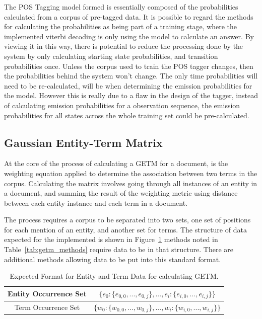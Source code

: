 \documentclass[10pt]{report}
\begin{document}
The POS Tagging model formed is essentially composed of the probabilities calculated from a corpus of pre-tagged data. It is possible to regard the methods for calculating the probabilities as being part of a training stage, where the implemented viterbi decoding is only using the model to calculate an answer. By viewing it in this way, there is potential to reduce the processing done by the system by only calculating starting state probabilities, and transition probabilities once. Unless the corpus used to train the POS tagger changes, then the probabilities behind the system won't change. The only time probabilities will need to be re-calculated, will be when determining the emission probabilities for the model. However this is really due to a flaw in the design of the tagger, instead of calculating emission probabilities for a observation sequence, the emission probabilities for all states across the whole training set could be pre-calculated.

\subsection{Gaussian Entity-Term Matrix}
At the core of the process of calculating a GETM for a document, is the weighting equation applied to determine the association between two terms in the corpus. Calculating the matrix involves going through all instances of an entity in a document, and summing the result of the weighting metric using distance between each entity instance and each term in a document.

The process requires a corpus to be separated into two sets, one set of positions for each mention of an entity, and another set for terms. The structure of data expected for the implemented is shown in Figure~\ref{fig:getm_data} methods noted in Table~\ref{tab:getm_methods} require data to be in that structure. There are additional methods allowing data to be put into this standard format.

\renewcommand{\baselinestretch}{2.0}\normalsize

\begin{table}[h!]
\centering
  \begin{tabular}{c | c}
  Entity Occurrence Set & \( \{e_0 : \{e_{0,0}, ..., e_{0,j}\}, ..., e_i : \{e_{i,0}, ..., e_{i,j}\}\}\)\\
  \hline
  Term Occurrence Set & \( \{w_0 : \{w_{0,0}, ..., w_{0,j}\}, ..., w_i : \{w_{i,0}, ..., w_{i,j}\}\}\)
  \end{tabular}
  \caption{Expected Format for Entity and Term Data for calculating GETM.\label{fig:getm_data}}
\end{table}
\renewcommand{\baselinestretch}{1.0}\normalsize
\end{document}
